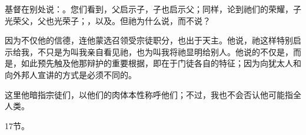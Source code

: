 \par

基督在别处说：。您们看到，父启示子，子也启示父；同样，论到祂们的荣耀，子光荣父，父也光荣子；，以及。但祂为什么说，而不说？\par

因为不仅他的信德，连他蒙选召领受宗徒职分，也出于天主。他说，祂这样特别启示给我，不只是为叫我亲自看见祂，也为叫我将祂显明给别人。他说的不仅是，而是，如此预先触及他那辩护的重要根据，即在于门徒各自的特征；因为向犹太人和向外邦人宣讲的方式是必须不同的。\par

\par

这里他暗指宗徒们，以他们的肉体本性称呼他们；不过，我也不会否认他可能指全人类。\par

17节。\par

